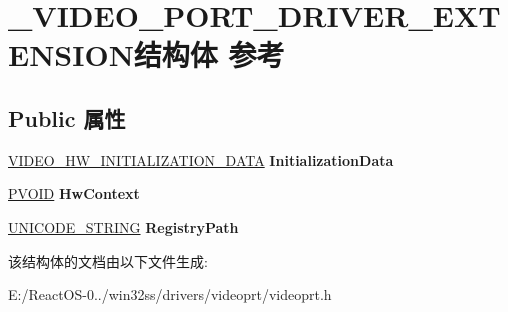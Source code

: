 \hypertarget{struct___v_i_d_e_o___p_o_r_t___d_r_i_v_e_r___e_x_t_e_n_s_i_o_n}{}\section{\+\_\+\+V\+I\+D\+E\+O\+\_\+\+P\+O\+R\+T\+\_\+\+D\+R\+I\+V\+E\+R\+\_\+\+E\+X\+T\+E\+N\+S\+I\+O\+N结构体 参考}
\label{struct___v_i_d_e_o___p_o_r_t___d_r_i_v_e_r___e_x_t_e_n_s_i_o_n}
\subsection*{Public 属性}
\begin{DoxyCompactItemize}
\item 
\mbox{\label{struct___v_i_d_e_o___p_o_r_t___d_r_i_v_e_r___e_x_t_e_n_s_i_o_n_af5513e8f8ec17bfb73e6ad9fd3d5170f}} 
\hyperlink{struct___v_i_d_e_o___h_w___i_n_i_t_i_a_l_i_z_a_t_i_o_n___d_a_t_a}{V\+I\+D\+E\+O\+\_\+\+H\+W\+\_\+\+I\+N\+I\+T\+I\+A\+L\+I\+Z\+A\+T\+I\+O\+N\+\_\+\+D\+A\+TA} {\bfseries Initialization\+Data}
\item 
\mbox{\label{struct___v_i_d_e_o___p_o_r_t___d_r_i_v_e_r___e_x_t_e_n_s_i_o_n_a3152a3342d43dcd613b061cfa156c513}} 
\hyperlink{interfacevoid}{P\+V\+O\+ID} {\bfseries Hw\+Context}
\item 
\mbox{\label{struct___v_i_d_e_o___p_o_r_t___d_r_i_v_e_r___e_x_t_e_n_s_i_o_n_aa882d51ad9c05cb29d5edf5803a5794b}} 
\hyperlink{struct___u_n_i_c_o_d_e___s_t_r_i_n_g}{U\+N\+I\+C\+O\+D\+E\+\_\+\+S\+T\+R\+I\+NG} {\bfseries Registry\+Path}
\end{DoxyCompactItemize}


该结构体的文档由以下文件生成\+:\begin{DoxyCompactItemize}
\item 
E\+:/\+React\+O\+S-\/0../win32ss/drivers/videoprt/videoprt.\+h\end{DoxyCompactItemize}

